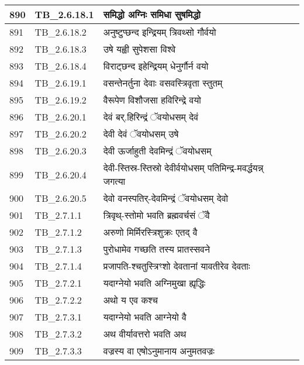 \documentclass[17pt]{extarticle}
\begin{document}
\begin{longtable}{||p{0.4in}||p{0.9in}||p{4.0in}||p{0.9in}||}
            890 & TB\_2.6.18.1 & समिद्धो अग्निः समिधा सुषमिद्धो &      \\
        \hline
            891 & TB\_2.6.18.2 & अनुष्टुप्छन्द इन्द्रियम् त्रिवथ्सो गौर्वयो &      \\
        \hline
            892 & TB\_2.6.18.3 & उषे यह्वी सुपेशसा विश्वे &      \\
        \hline
            893 & TB\_2.6.18.4 & विराट्छन्द इहेन्द्रियम् धेनुर्गौर्न वयो &      \\
        \hline
            894 & TB\_2.6.19.1 & वसन्तेनर्तुना देवाः वसवस्त्रिवृता स्तुतम् &      \\
        \hline
            895 & TB\_2.6.19.2 & वैरूपेण विशौजसा हविरिन्द्रे वयो &      \\
        \hline
            896 & TB\_2.6.20.1 & देवं बर्.हिरिन्द्रं ॅवयोधसम् देवं &      \\
        \hline
            897 & TB\_2.6.20.2 & देवी देवं ॅवयोधसम् उषे &      \\
        \hline
            898 & TB\_2.6.20.3 & देवी ऊर्जाहुती देवमिन्द्रं ॅवयोधसम् &      \\
        \hline
            899 & TB\_2.6.20.4 & देवी{-}स्तिस्र{-}स्तिस्रो देवीर्वयोधसम् पतिमिन्द्र{-}मवर्द्धयन्न् जगत्या &      \\
        \hline
            900 & TB\_2.6.20.5 & देवो वनस्पतिर्{-}देवमिन्द्रं ॅवयोधसम् देवो &      \\
        \hline
            901 & TB\_2.7.1.1 & त्रिवृथ्{-}स्तोमो भवति ब्रह्मवर्चसं ॅवै &      \\
        \hline
            902 & TB\_2.7.1.2 & अरुणो मिर्मिरस्त्रिशुक्रः एतद् वै &      \\
        \hline
            903 & TB\_2.7.1.3 & पुरोधामेव गच्छति तस्य प्रातस्सवने &      \\
        \hline
            904 & TB\_2.7.1.4 & प्रजापति{-}श्चतुस्त्रिꣳशो देवतानां यावतीरेव देवताः &      \\
        \hline
            905 & TB\_2.7.2.1 & यदाग्नेयो भवति अग्निमुखा ह्यृद्धिः &      \\
        \hline
            906 & TB\_2.7.2.2 & अथो य एव कश्च &      \\
        \hline
            907 & TB\_2.7.3.1 & यदाग्नेयो भवति आग्नेयो वै &      \\
        \hline
            908 & TB\_2.7.3.2 & अथ वीर्यावत्तरो भवति अथ &      \\
        \hline
            909 & TB\_2.7.3.3 & वज्रस्य वा एषोऽनुमानाय अनुमतवज्रः &      \\

\end{longtable}
\end{document}
